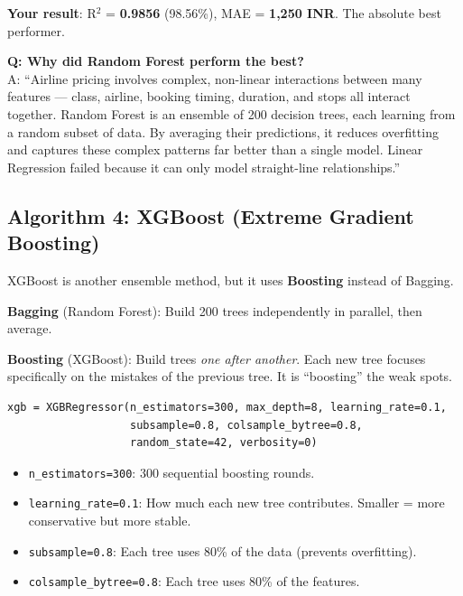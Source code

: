 \documentclass[12pt, a4paper]{article}
\begin{document}
\textbf{Your result}: R$^2$ = \textbf{0.9856} (98.56\%), MAE = \textbf{1,250 INR}. The absolute best performer.

\begin{warnbox}
    \textbf{Q: Why did Random Forest perform the best?} \\
    A: ``Airline pricing involves complex, non-linear interactions between many features — class, airline, booking timing, duration, and stops all interact together. Random Forest is an ensemble of 200 decision trees, each learning from a random subset of data. By averaging their predictions, it reduces overfitting and captures these complex patterns far better than a single model. Linear Regression failed because it can only model straight-line relationships.''
\end{warnbox}


\subsection{Algorithm 4: XGBoost (Extreme Gradient Boosting)}

\begin{conceptbox}
    XGBoost is another ensemble method, but it uses \textbf{Boosting} instead of Bagging.

    \textbf{Bagging} (Random Forest): Build 200 trees independently in parallel, then average.

    \textbf{Boosting} (XGBoost): Build trees \textit{one after another}. Each new tree focuses specifically on the mistakes of the previous tree. It is ``boosting'' the weak spots.
\end{conceptbox}

\begin{lstlisting}
xgb = XGBRegressor(n_estimators=300, max_depth=8, learning_rate=0.1,
                   subsample=0.8, colsample_bytree=0.8,
                   random_state=42, verbosity=0)
\end{lstlisting}

\begin{itemize}
    \item \texttt{n\_estimators=300}: 300 sequential boosting rounds.
    \item \texttt{learning\_rate=0.1}: How much each new tree contributes. Smaller = more conservative but more stable.
    \item \texttt{subsample=0.8}: Each tree uses 80\% of the data (prevents overfitting).
    \item \texttt{colsample\_bytree=0.8}: Each tree uses 80\% of the features.
\end{itemize}
\end{document}
